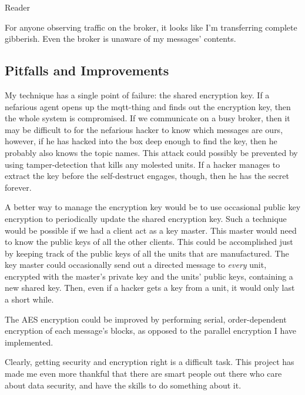 \documentclass[final,titlepage,onecolumn]{article}
\begin{document}
\begin{center}Reader\end{center}
\lstset{style=None}


For anyone observing traffic on the broker, it looks like I'm transferring complete gibberish. Even the broker is unaware of my messages' contents.
\subsection{Pitfalls and Improvements}

My technique has a single point of failure: the shared encryption key. If a nefarious agent opens up the mqtt-thing and finds out the encryption key, then the whole system is compromised. If we communicate on a busy broker, then it may be difficult to for the nefarious hacker to know which messages are ours, however, if he has hacked into the box deep enough to find the key, then he probably also knows the topic names. This attack could possibly be prevented by using tamper-detection that kills any molested units. If a hacker manages to extract the key before the self-destruct engages, though, then he has the secret forever.

A better way to manage the encryption key would be to use occasional public key encryption to periodically update the shared encryption key. Such a technique would be possible if we had a client act as a key master. This master would need to know the public keys of all the other clients. This could be accomplished just by keeping track of the public keys of all the units that are manufactured. The key master could occasionally send out a directed message to \emph{every} unit, encrypted with the master's private key and the units' public keys, containing a new shared key. Then, even if a hacker gets a key from a unit, it would only last a short while.

The AES encryption could be improved by performing serial, order-dependent encryption of each message's blocks, as opposed to the parallel encryption I have implemented. 

Clearly, getting security and encryption right is a difficult task. This project has made me even more thankful that there are smart people out there who care about data security, and have the skills to do something about it.
\end{document}
